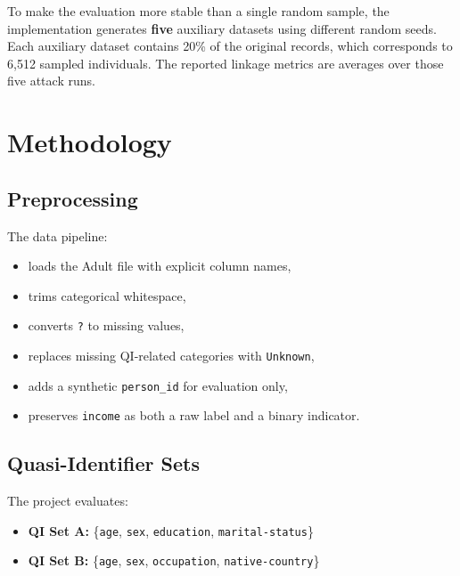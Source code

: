 \documentclass[11pt]{article}
\begin{document}
To make the evaluation more stable than a single random sample, the implementation generates \textbf{five} auxiliary datasets using different random seeds. Each auxiliary dataset contains 20\% of the original records, which corresponds to 6,512 sampled individuals. The reported linkage metrics are averages over those five attack runs.

\section{Methodology}
\subsection{Preprocessing}
The data pipeline:
\begin{itemize}[leftmargin=*]
    \item loads the Adult file with explicit column names,
    \item trims categorical whitespace,
    \item converts \texttt{?} to missing values,
    \item replaces missing QI-related categories with \texttt{Unknown},
    \item adds a synthetic \texttt{person\_id} for evaluation only,
    \item preserves \texttt{income} as both a raw label and a binary indicator.
\end{itemize}

\subsection{Quasi-Identifier Sets}
The project evaluates:
\begin{itemize}[leftmargin=*]
    \item \textbf{QI Set A:} \{\texttt{age}, \texttt{sex}, \texttt{education}, \texttt{marital-status}\}
    \item \textbf{QI Set B:} \{\texttt{age}, \texttt{sex}, \texttt{occupation}, \texttt{native-country}\}
\end{itemize}
\end{document}
